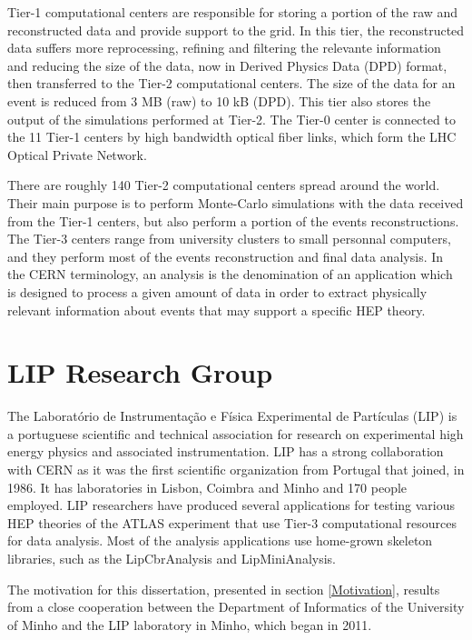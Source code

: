 Tier-1 computational centers are responsible for storing a portion of the raw and reconstructed data and provide support to the grid. In this tier, the reconstructed data suffers more reprocessing, refining and filtering the relevante information and reducing the size of the data, now in Derived Physics Data (DPD) format, then transferred to the Tier-2 computational centers. The size of the data for an event is reduced from 3 MB (raw) to 10 kB (DPD). This tier also stores the output of the simulations performed at Tier-2. The Tier-0 center is connected to the 11 Tier-1 centers by high bandwidth optical fiber links, which form the LHC Optical Private Network.

There are roughly 140 Tier-2 computational centers spread around the world. Their main purpose is to perform Monte-Carlo simulations with the data received from the Tier-1 centers, but also perform a portion of the events reconstructions. The Tier-3 centers range from university clusters to small personnal computers, and they perform most of the events reconstruction and final data analysis. In the CERN terminology, an analysis is the denomination of an application which is designed to process a given amount of data in order to extract physically relevant information about events that may support a specific HEP theory.

\section{LIP Research Group}
\label{LIP}

The Laboratório de Instrumentação e Física Experimental de Partículas (LIP) \cite{LIP} is a portuguese scientific and technical association for research on experimental high energy physics and associated instrumentation. LIP has a strong collaboration with CERN as it was the first scientific organization from Portugal that joined, in 1986. It has laboratories in Lisbon, Coimbra and Minho and 170 people employed. LIP researchers have produced several applications for testing various HEP theories of the ATLAS experiment that use Tier-3 computational resources for data analysis. Most of the analysis applications use home-grown skeleton libraries, such as the LipCbrAnalysis and LipMiniAnalysis.

The motivation for this dissertation, presented in section \ref{Motivation}, results from a close cooperation between the Department of Informatics of the University of Minho and the LIP laboratory in Minho, which began in 2011.

